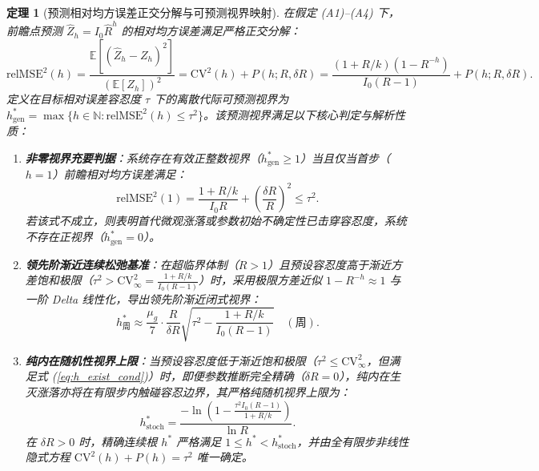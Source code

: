 \documentclass[11pt,a4paper]{article}
\theoremstyle{plain}
\newtheorem{theorem}{定理}
\theoremstyle{definition}
\begin{document}
\begin{theorem}[预测相对均方误差正交分解与可预测视界映射]\label{thm:horizon}
在假定 (A1)--(A4) 下，前瞻点预测 $\hat{Z}_h = I_0 \hat{R}^h$ 的相对均方误差满足严格正交分解：
\begin{equation}
\text{relMSE}^2(h) = \frac{\mathbb{E}[(\hat{Z}_h - Z_h)^2]}{(\mathbb{E}[Z_h])^2} = \text{CV}^2(h) + P(h; R, \delta R) = \frac{(1+R/k)(1-R^{-h})}{I_0(R-1)} + P(h; R, \delta R).
\label{eq:relmse_decomp}
\end{equation}
定义在目标相对误差容忍度 $\tau$ 下的离散代际可预测视界为 $h^*_{\text{gen}} = \max \{ h \in \mathbb{N} : \text{relMSE}^2(h) \le \tau^2 \}$。该预测视界满足以下核心判定与解析性质：
\begin{enumerate}
\item \textbf{非零视界充要判据}：系统存在有效正整数视界（$h^*_{\text{gen}} \ge 1$）当且仅当首步（$h=1$）前瞻相对均方误差满足：
\begin{equation}
\text{relMSE}^2(1) = \frac{1+R/k}{I_0 R} + \left(\frac{\delta R}{R}\right)^2 \le \tau^2.
\label{eq:h_exist_cond}
\end{equation}
若该式不成立，则表明首代微观涨落或参数初始不确定性已击穿容忍度，系统不存在正视界（$h^*_{\text{gen}} = 0$）。
\item \textbf{领先阶渐近连续松弛基准}：在超临界体制（$R > 1$）且预设容忍度高于渐近方差饱和极限（$\tau^2 > \text{CV}^2_\infty = \frac{1+R/k}{I_0(R-1)}$）时，采用极限方差近似 $1-R^{-h} \approx 1$ 与一阶 Delta 线性化，导出领先阶渐近闭式视界：
\begin{equation}
h^*_{\text{周}} \approx \frac{\mu_g}{7} \cdot \frac{R}{\delta R} \sqrt{\tau^2 - \frac{1+R/k}{I_0(R-1)}} \quad (\text{周}).
\label{eq:horizon_cn}
\end{equation}
\item \textbf{纯内在随机性视界上限}：当预设容忍度低于渐近饱和极限（$\tau^2 \le \text{CV}^2_\infty$，但满足式 (\ref{eq:h_exist_cond})）时，即便参数推断完全精确（$\delta R = 0$），纯内在生灭涨落亦将在有限步内触碰容忍边界，其严格纯随机视界上限为：
\begin{equation}
h^*_{\text{stoch}} = \frac{-\ln\left(1 - \frac{\tau^2 I_0(R-1)}{1+R/k}\right)}{\ln R}.
\label{eq:h_stoch_bound}
\end{equation}
在 $\delta R > 0$ 时，精确连续根 $h^*$ 严格满足 $1 \le h^* < h^*_{\text{stoch}}$，并由全有限步非线性隐式方程 $\text{CV}^2(h) + P(h) = \tau^2$ 唯一确定。
\end{enumerate}
\end{theorem}
\end{document}

